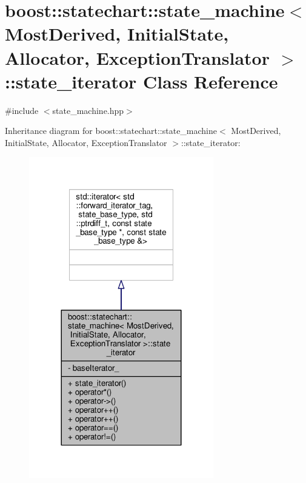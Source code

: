 \hypertarget{classboost_1_1statechart_1_1state__machine_1_1state__iterator}{}\section{boost\+:\+:statechart\+:\+:state\+\_\+machine$<$ Most\+Derived, Initial\+State, Allocator, Exception\+Translator $>$\+:\+:state\+\_\+iterator Class Reference}
\label{classboost_1_1statechart_1_1state__machine_1_1state__iterator}


{\ttfamily \#include $<$state\+\_\+machine.\+hpp$>$}



Inheritance diagram for boost\+:\+:statechart\+:\+:state\+\_\+machine$<$ Most\+Derived, Initial\+State, Allocator, Exception\+Translator $>$\+:\+:state\+\_\+iterator\+:
\nopagebreak
\begin{figure}[H]
\begin{center}
\leavevmode
\includegraphics[width=228pt]{classboost_1_1statechart_1_1state__machine_1_1state__iterator__inherit__graph}
\end{center}
\end{figure}


